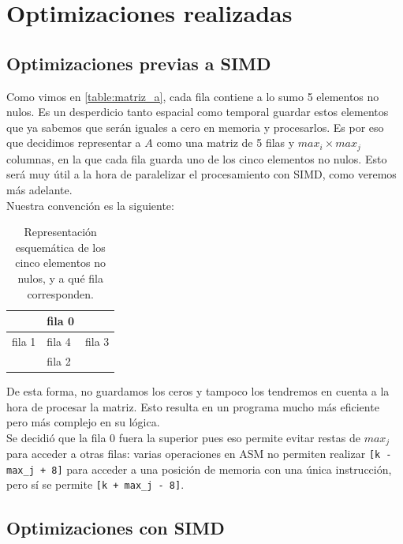 \documentclass[a4paper]{article}
\begin{document}
\newpage

\section{Optimizaciones realizadas}

\subsection{Optimizaciones previas a SIMD}

Como vimos en \ref{table:matriz_a}, cada fila contiene a lo sumo 5 elementos no 
nulos. Es un desperdicio tanto espacial como temporal guardar estos elementos que ya sabemos
que serán iguales a cero en memoria y procesarlos.
Es por eso que decidimos representar a $A$ como una matriz de 5 filas y $max_i \times max_j$ columnas, 
en la que cada fila guarda uno de los cinco elementos no nulos. Esto será muy útil a la hora de paralelizar
el procesamiento con SIMD, como veremos más adelante. \\
Nuestra convención es la siguiente: 

\begin{table}[!htbp]
\centering
\label{cincovecinos}
\begin{tabular}{l|l|l}
\cline{2-2}
                       & fila 0 &                       \\ \hline
\multicolumn{1}{|l|}{fila 1} & fila 4 & \multicolumn{1}{l|}{fila 3} \\ \hline
                       & fila 2 &                       \\ \cline{2-2}
\end{tabular}
\caption{Representación esquemática de los cinco elementos no nulos, y a qué fila corresponden.}
\end{table}

De esta forma, no guardamos los ceros y tampoco los tendremos en cuenta a la hora de procesar la 
matriz. Esto resulta en un programa mucho más eficiente pero más complejo en su lógica.\\

Se decidió que la fila 0 fuera la superior pues eso permite evitar 
restas de $max_j$ para acceder a otras filas: varias operaciones en ASM no permiten
realizar \texttt{[k - max\_j + 8]} para acceder a una posición de memoria con una única instrucción,
pero sí se permite \texttt{[k + max\_j - 8]}. \\

\subsection{Optimizaciones con SIMD} 
\end{document}

